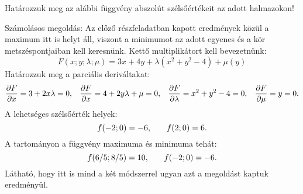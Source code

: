 \documentclass[exercise]{math-standalone}
\begin{document}
\begin{exercise}{%
    Határozzuk meg az alábbi függvény abszolút szélsőértékeit az adott
    halmazokon!
  }
{\begin{enumerate}[a)]
            Számolásos megoldás: Az előző részfeladatban kapott eredmények
            közül a maximum itt is helyt áll, viszont a minimumot az adott
            egyenes és a kör metszéspontjaiban kell keresnünk. Kettő
            multiplikátort kell bevezetnünk:
            \[
              F(x; y; \lambda; \mu) = 3x + 4y + \lambda (x^2 + y^2 - 4) + \mu (y)
            \]
            Határozzuk meg a parciális deriváltakat:
            \[
              \pdv{F}{x} = 3 + 2x \lambda = 0
              \text, \quad
              \pdv{F}{x} = 4 + 2y \lambda + \mu = 0
              \text, \quad
              \pdv{F}{\lambda} = x^2 + y^2 - 4 = 0
              \text, \quad
              \pdv{F}{\mu} = y = 0
              \text.
            \]
            A lehetséges szélsőérték helyek:
            \[
              f(-2;0) = -6
              \text,
              \qquad
              f(2;0) = 6
              \text.
            \]
            A tartományon a függvény maximuma és minimuma tehát:
            \[
              f(6/5; 8/5) = 10
              \text,\qquad
              f(-2; 0) = -6
              \text.
            \]
            Látható, hogy itt is mind a két módszerrel ugyan azt a megoldást
            kaptuk eredményül.
    \end{enumerate}
  }
\end{exercise}
\end{document}
